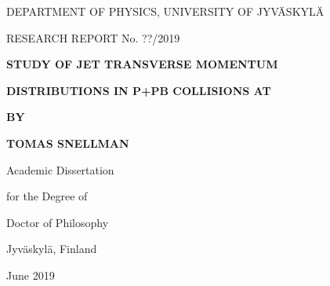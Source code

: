 



\thispagestyle{empty}
\vspace*{10mm}

\centerline{DEPARTMENT OF PHYSICS, UNIVERSITY OF JYV\"ASKYL\"A}
\centerline{RESEARCH REPORT No. ??/2019}

\vspace{25mm} 

\centerline{\bf STUDY OF JET TRANSVERSE MOMENTUM }
\centerline{\bf DISTRIBUTIONS IN P+PB COLLISIONS AT }
\centerline{\bf }

\vspace{13mm}


\centerline{\bf BY}
\centerline{\bf TOMAS SNELLMAN}

\vspace{13mm}

\centerline{Academic Dissertation}
\centerline{for the Degree of}
\centerline{Doctor of Philosophy}

\vspace{13mm}


\vspace{13mm}




\centerline{Jyv\"askyl\"a, Finland}
\centerline{June 2019}

\pagebreak
\thispagestyle{empty}

\vspace*{25mm} 

